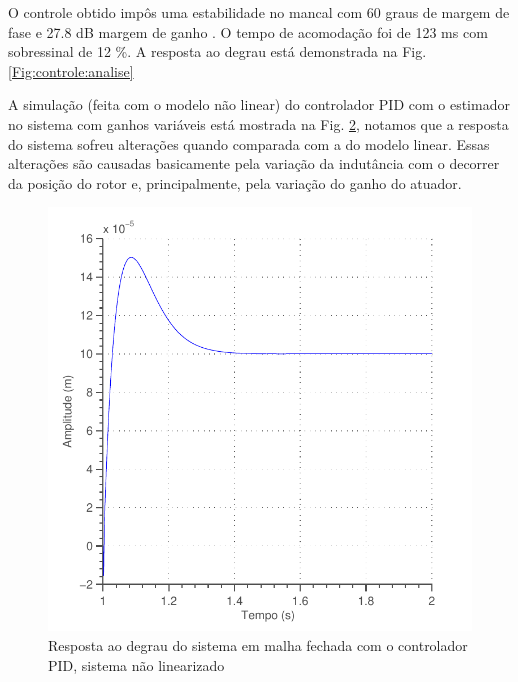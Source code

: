 O controle obtido impôs uma estabilidade no mancal com 60 graus de margem de fase e 27.8 dB margem de ganho . O tempo de acomodação foi de 123 ms com sobressinal de 12 \%. A resposta ao degrau está demonstrada na Fig. \ref{Fig:controle:analise}

\begin{figure}[ht!]
\centering

\label{fig:controle:degrau}
\end{figure}

A simulação (feita com o modelo não linear) do controlador PID  com o estimador no sistema com ganhos variáveis está mostrada na Fig. \ref{fig:pid_nlinear_degrau}, notamos que a resposta do sistema sofreu alterações quando comparada com a do modelo linear. Essas alterações são causadas basicamente pela variação da indutância com o decorrer da posição do rotor e, principalmente, pela variação do ganho do atuador.

\begin{figure}[ht]
\centering
\includegraphics[width=0.7\linewidth]{Figs/controle/pid_nlinear_degrau}
\caption{Resposta ao degrau do sistema em malha fechada com o controlador PID, sistema não linearizado}
\label{fig:pid_nlinear_degrau}
\end{figure}

